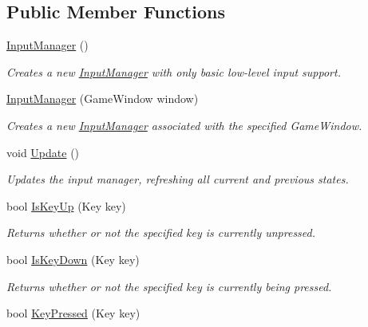 \subsection*{Public Member Functions}
\begin{DoxyCompactItemize}
\item 
\hyperlink{class_tri_devs_1_1_tri_engine_1_1_input_1_1_input_manager_ac2a06ddea61f96a01351db3831ef5e46}{Input\-Manager} ()
\begin{DoxyCompactList}\small\item\em Creates a new \hyperlink{class_tri_devs_1_1_tri_engine_1_1_input_1_1_input_manager}{Input\-Manager} with only basic low-\/level input support. \end{DoxyCompactList}\item 
\hyperlink{class_tri_devs_1_1_tri_engine_1_1_input_1_1_input_manager_aa4f50b2baf8de39d86bbd5044fe36970}{Input\-Manager} (Game\-Window window)
\begin{DoxyCompactList}\small\item\em Creates a new \hyperlink{class_tri_devs_1_1_tri_engine_1_1_input_1_1_input_manager}{Input\-Manager} associated with the specified Game\-Window. \end{DoxyCompactList}\item 
void \hyperlink{class_tri_devs_1_1_tri_engine_1_1_input_1_1_input_manager_a5ccafc008745b79e50784c6b5f8cea7c}{Update} ()
\begin{DoxyCompactList}\small\item\em Updates the input manager, refreshing all current and previous states. \end{DoxyCompactList}\item 
bool \hyperlink{class_tri_devs_1_1_tri_engine_1_1_input_1_1_input_manager_a77df9c0a6364d25d0a441879766d8e36}{Is\-Key\-Up} (Key key)
\begin{DoxyCompactList}\small\item\em Returns whether or not the specified key is currently unpressed. \end{DoxyCompactList}\item 
bool \hyperlink{class_tri_devs_1_1_tri_engine_1_1_input_1_1_input_manager_ad335148b7924c28531202538ecba26a3}{Is\-Key\-Down} (Key key)
\begin{DoxyCompactList}\small\item\em Returns whether or not the specified key is currently being pressed. \end{DoxyCompactList}\item 
bool \hyperlink{class_tri_devs_1_1_tri_engine_1_1_input_1_1_input_manager_a68244367e568baddab970a017edc1c0f}{Key\-Pressed} (Key key)

\end{DoxyCompactItemize}
